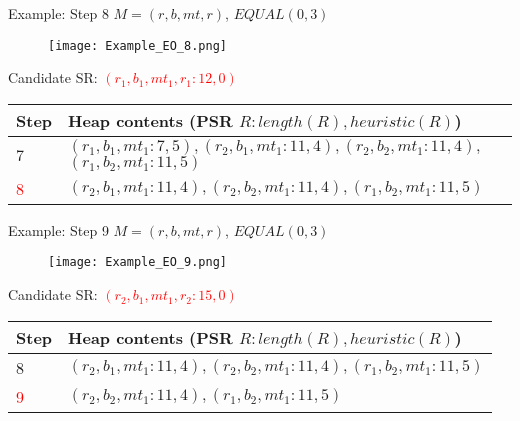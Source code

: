 \begin{frame}{Example: Step 8}
	$M = (r, b, mt, r)$, $EQUAL(0, 3)$
	
	\begin{figure}[h]
		\texttt{[image: Example\_EO\_8.png]}
	\end{figure}
	
	Candidate SR: \textcolor{red}{$(r_1, b_1, mt_1, r_1 : 12, 0)$}
	
	\begin{table}[h]
		\centering
		\begin{tabular}{ |l|p{10cm}| } 
			\hline
			Step & Heap contents (PSR $R : length(R), heuristic(R)$) \\
			\hline
			7 & $(r_1, b_1, mt_1 : 7, 5), (r_2, b_1, mt_1 : 11, 4), (r_2, b_2, mt_1 : 11, 4),$ \newline $(r_1, b_2, mt_1 : 11, 5)$ \\ 
			\hline
			\textcolor{red}{8} & $(r_2, b_1, mt_1 : 11, 4), (r_2, b_2, mt_1 : 11, 4), (r_1, b_2, mt_1 : 11, 5)$ \\ 
			\hline
		\end{tabular}
	\end{table}

\end{frame}

\begin{frame}{Example: Step 9}
	$M = (r, b, mt, r)$, $EQUAL(0, 3)$
	
	\begin{figure}[h]
		\texttt{[image: Example\_EO\_9.png]}
	\end{figure}
	
	Candidate SR: \textcolor{red}{$(r_2, b_1, mt_1, r_2 : 15, 0)$}

	\begin{table}[h]
		\centering
		\begin{tabular}{ |l|p{10cm}| } 
			\hline
			Step & Heap contents (PSR $R : length(R), heuristic(R)$) \\
			\hline
			8 & $(r_2, b_1, mt_1 : 11, 4), (r_2, b_2, mt_1 : 11, 4), (r_1, b_2, mt_1 : 11, 5)$ \\ 
			\hline
			\textcolor{red}{9} & $(r_2, b_2, mt_1 : 11, 4), (r_1, b_2, mt_1 : 11, 5)$ \\ 
			\hline
		\end{tabular}
	\end{table}

\end{frame}

